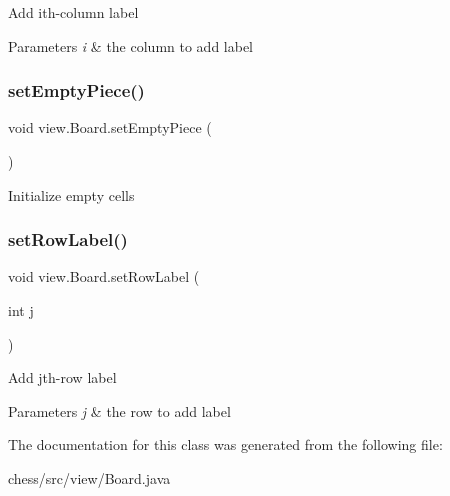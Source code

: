 Add ith-\/column label


\begin{DoxyParams}{Parameters}
{\em i} & the column to add label \\
\hline
\end{DoxyParams}
\mbox{\label{classview_1_1_board_a2c7d05a8fa6a3ee5bc8fc40ccdb0b487}} 
\subsubsection{\texorpdfstring{setEmptyPiece()}{setEmptyPiece()}}
{\footnotesize\ttfamily void view.\+Board.\+set\+Empty\+Piece (\begin{DoxyParamCaption}{ }\end{DoxyParamCaption})\hspace{0.3cm}{\ttfamily [inline]}}

Initialize empty cells \mbox{\label{classview_1_1_board_aaf1c1066d7df098ab7b7a4e1d00beb25}} 
\subsubsection{\texorpdfstring{setRowLabel()}{setRowLabel()}}
{\footnotesize\ttfamily void view.\+Board.\+set\+Row\+Label (\begin{DoxyParamCaption}\item[{int}]{j }\end{DoxyParamCaption})\hspace{0.3cm}{\ttfamily [inline]}}

Add jth-\/row label


\begin{DoxyParams}{Parameters}
{\em j} & the row to add label \\
\hline
\end{DoxyParams}


The documentation for this class was generated from the following file\+:\begin{DoxyCompactItemize}
\item 
chess/src/view/Board.\+java\end{DoxyCompactItemize}
